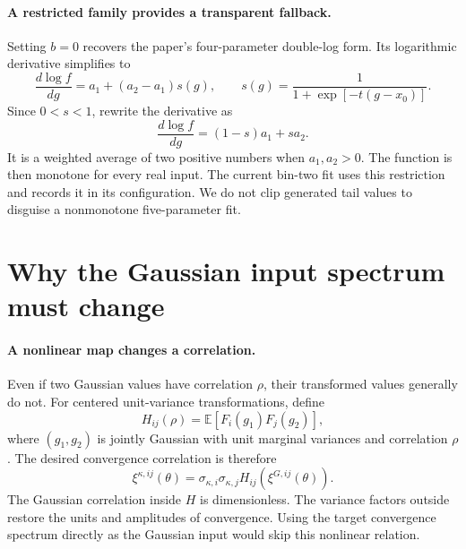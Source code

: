 \documentclass[11pt]{article}
\newcommand{\E}{\mathbb E}
\begin{document}
\paragraph{A restricted family provides a transparent fallback.}
Setting $b=0$ recovers the paper's four-parameter double-log form. Its
logarithmic derivative simplifies to
\begin{equation}
 \frac{d\log f}{dg}=a_1+(a_2-a_1)s(g),
 \qquad s(g)=\frac1{1+\exp[-t(g-x_0)]}.
\end{equation}
Since $0<s<1$, rewrite the derivative as
\begin{equation}
 \frac{d\log f}{dg}=(1-s)a_1+s a_2.
\end{equation}
It is a weighted average of two positive numbers when $a_1,a_2>0$.
The function is then monotone for every real input. The current bin-two
fit uses this restriction and records it in its configuration. We do not
clip generated tail values to disguise a nonmonotone five-parameter fit.

\section{Why the Gaussian input spectrum must change}
\paragraph{A nonlinear map changes a correlation.}
Even if two Gaussian values have correlation $\rho$, their transformed
values generally do not. For centered unit-variance transformations, define
\begin{equation}
 H_{ij}(\rho)=\E[F_i(g_1)F_j(g_2)],
\end{equation}
where $(g_1,g_2)$ is jointly Gaussian with unit marginal variances and
correlation $\rho$. The desired convergence correlation is therefore
\begin{equation}
 \xi^{\kappa,ij}(\theta)=
 \sigma_{\kappa,i}\sigma_{\kappa,j}
 H_{ij}\!\left(\xi^{G,ij}(\theta)\right).
\end{equation}
The Gaussian correlation inside $H$ is dimensionless. The variance
factors outside restore the units and amplitudes of convergence.
Using the target convergence spectrum directly as the Gaussian input
would skip this nonlinear relation.
\end{document}
